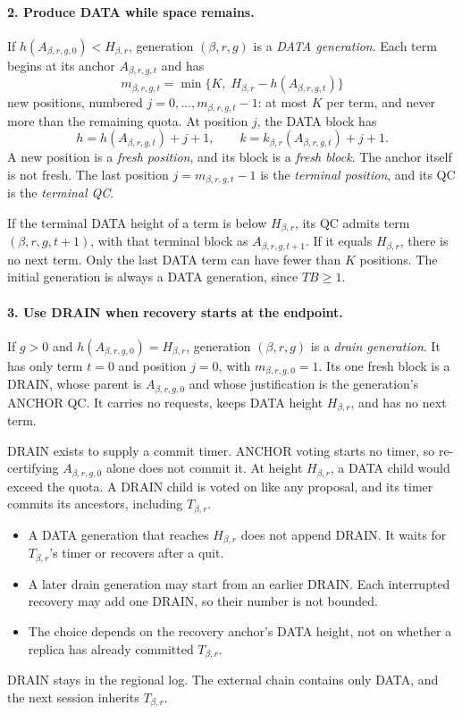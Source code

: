 \documentclass[11pt,a4paper]{article}
\newcommand{\TB}{\mathit{TB}}
\newcommand{\defterm}[1]{\textcolor{rrBlue}{\textit{#1}}}
\begin{document}
\paragraph{2. Produce DATA while space remains.}
If $h(A_{\beta,r,g,0})<H_{\beta,r}$, generation $(\beta,r,g)$ is a
\defterm{DATA generation}. Each term begins at its anchor
$A_{\beta,r,g,t}$ and has
\[
 m_{\beta,r,g,t}=\min\{K,\;H_{\beta,r}-h(A_{\beta,r,g,t})\}
\]
new positions, numbered $j=0,\ldots,m_{\beta,r,g,t}-1$: at most $K$ per
term, and never more than the remaining quota. At position $j$, the DATA
block has
\[
 h=h(A_{\beta,r,g,t})+j+1,\qquad
 k=k_{\beta,r}(A_{\beta,r,g,t})+j+1.
\]
A new position is a \defterm{fresh position}, and its block is a
\defterm{fresh block}. The anchor itself is not fresh. The last position
$j=m_{\beta,r,g,t}-1$ is the \defterm{terminal position}, and its QC is
the \defterm{terminal QC}.

If the terminal DATA height of a term is below $H_{\beta,r}$, its QC
admits term $(\beta,r,g,t+1)$, with that terminal block as
$A_{\beta,r,g,t+1}$. If it equals $H_{\beta,r}$, there is no next term.
Only the last DATA term can have fewer than $K$ positions. The initial
generation is always a DATA generation, since $\TB\ge1$.

\paragraph{3. Use DRAIN when recovery starts at the endpoint.}
If $g>0$ and $h(A_{\beta,r,g,0})=H_{\beta,r}$, generation $(\beta,r,g)$ is
a \defterm{drain generation}. It has only term $t=0$ and position $j=0$,
with $m_{\beta,r,g,0}=1$. Its one fresh block is a DRAIN, whose parent is
$A_{\beta,r,g,0}$ and whose justification is the generation's ANCHOR QC.
It carries no requests, keeps DATA height $H_{\beta,r}$, and has no next
term.

DRAIN exists to supply a commit timer. ANCHOR voting starts no timer, so
re-certifying $A_{\beta,r,g,0}$ alone does not commit it. At height
$H_{\beta,r}$, a DATA child would exceed the quota. A DRAIN child is
voted on like any proposal, and its timer commits its ancestors,
including $T_{\beta,r}$.
\begin{itemize}
\item A DATA generation that reaches $H_{\beta,r}$ does not append DRAIN.
It waits for $T_{\beta,r}$'s timer or recovers after a quit.
\item A later drain generation may start from an earlier DRAIN.
Each interrupted recovery may add one DRAIN, so their number is not
bounded.
\item The choice depends on the recovery anchor's DATA height, not on
whether a replica has already committed $T_{\beta,r}$.
\end{itemize}
DRAIN stays in the regional log. The external chain contains only DATA,
and the next session inherits $T_{\beta,r}$.
\end{document}
